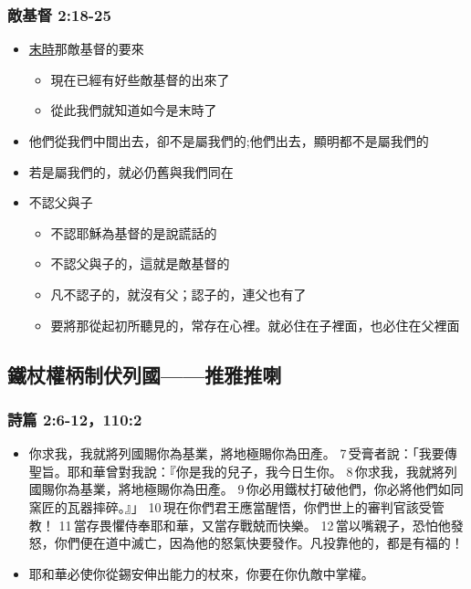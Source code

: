 \subsubsection{敵基督 2:18-25}
\begin{itemize}%
\itemsep-.5em
\item  \underline{末時}那敵基督的要來
\begin{itemize}%
\itemsep-.5em 
\item  現在已經有好些敵基督的出來了
\item  從此我們就知道如今是末時了
\end{itemize} 
\item  他們從我們中間出去，卻不是屬我們的;他們出去，顯明都不是屬我們的
\item  若是屬我們的，就必仍舊與我們同在
\item  不認父與子
\begin{itemize}%
\itemsep-.5em 
\item  不認耶穌為基督的是說謊話的
\item  不認父與子的，這就是敵基督的
\item  凡不認子的，就沒有父；認子的，連父也有了
\item  要將那從起初所聽見的，常存在心裡。就必住在子裡面，也必住在父裡面
\end{itemize}
\end{itemize}




  





\subsection{鐵杖權柄制伏列國——推雅推喇}
\subsubsection{詩篇 2:6-12，110:2}
\begin{itemize} 
\itemsep-.25em
\item 你求我，我就將列國賜你為基業，將地極賜你為田產。
7 受膏者說：「我要傳聖旨。耶和華曾對我說：『你是我的兒子，我今日生你。
8 你求我，我就將列國賜你為基業，將地極賜你為田產。
9 你必用鐵杖打破他們，你必將他們如同窯匠的瓦器摔碎。』」
10 現在你們君王應當醒悟，你們世上的審判官該受管教！
11 當存畏懼侍奉耶和華，又當存戰兢而快樂。
12 當以嘴親子，恐怕他發怒，你們便在道中滅亡，因為他的怒氣快要發作。凡投靠他的，都是有福的！
\item 耶和華必使你從錫安伸出能力的杖來，你要在你仇敵中掌權。
\end{itemize} 

